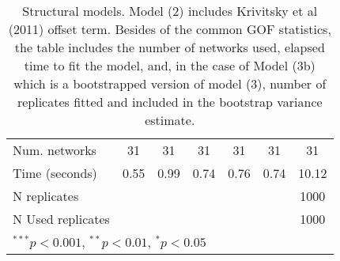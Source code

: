 \begin{table}[tb]
\begin{center}
\begin{tabular}{l c c c c c c }
$$Num. networks                & 31            & 31           & 31            & 31            & 31           & 31            \\
Time (seconds)               & 0.55          & 0.99         & 0.74          & 0.76          & 0.74         & 10.12         \\
N replicates                 &               &              &               &               &              & 1000          \\
N Used replicates            &               &              &               &               &              & 1000          \\
\bottomrule
\multicolumn{7}{l}{\scriptsize{$^{***}p<0.001$, $^{**}p<0.01$, $^*p<0.05$}}
\end{tabular}
\normalsize 
\caption{Structural models. Model (2) includes Krivitsky et al (2011) offset term. Besides of the common GOF statistics, the table includes the number of networks used, elapsed time to fit the model, and, in the case of Model (3b) which is a bootstrapped version of model (3), number of replicates fitted and included in the bootstrap variance estimate.}
\label{tab:ci-ergm-baseline}
\end{center}
\end{table}
